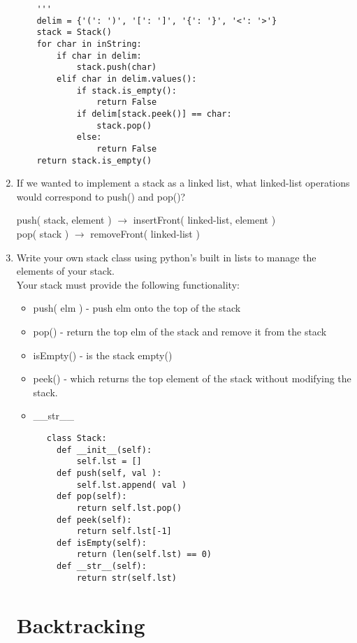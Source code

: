\documentclass[11pt]{article}
\newenvironment{answer}{\large\lstset{basicstyle=\large}\color{white}}{}
\newenvironment{answer}{\large\lstset{basicstyle=\large}\color{red}}{}
\begin{document}
\begin{enumerate}
\begin{answer}
\begin{lstlisting}
    '''
    delim = {'(': ')', '[': ']', '{': '}', '<': '>'}
    stack = Stack()
    for char in inString:
        if char in delim:
            stack.push(char)
        elif char in delim.values():
            if stack.is_empty():
                return False
            if delim[stack.peek()] == char:
                stack.pop()
            else:
                return False
    return stack.is_empty()
    \end{lstlisting}
    \end{answer}

\item If we wanted to implement a stack as a linked list, what linked-list
	operations would correspond to push() and pop()?

	\begin{answer}
	push( stack, element ) $\rightarrow$ insertFront( linked-list, element )\\
	pop( stack ) $\rightarrow$ removeFront( linked-list )
	\end{answer}
	
\item Write your own stack class using python's built in lists to manage the elements of your stack. \\
Your stack must provide the following functionality:
	  \begin{itemize}
	  \item []push( elm ) - push elm onto the top of the stack
	  \item []pop() - return the top elm of the stack and remove it from the stack
	  \item []isEmpty() - is the stack empty()
	  \item []peek() - which returns the top element of the stack without modifying the stack. 
	  \item []\_\_str\_\_
	  \end{itemize}
	  \begin{answer}
	  \begin{lstlisting}
	  class Stack:
		def __init__(self):
			self.lst = []
		def push(self, val ):
			self.lst.append( val )
		def pop(self):
			return self.lst.pop()
		def peek(self):
			return self.lst[-1]
		def isEmpty(self):
			return (len(self.lst) == 0)
		def __str__(self):
			return str(self.lst)
			  \end{lstlisting}
	  \end{answer}

\section*{Backtracking}


\end{enumerate}
\end{document}
